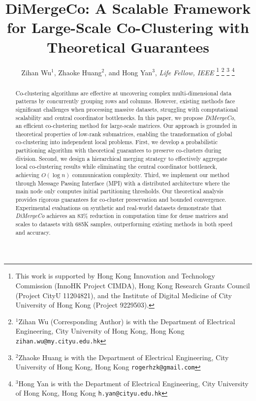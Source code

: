 \documentclass[journal]{IEEEtran}
\theoremstyle{definition}
\theoremstyle{remark} %
\begin{document}
\title{\LARGE \bf DiMergeCo: A Scalable Framework for Large-Scale Co-Clustering with Theoretical Guarantees}


\author{Zihan Wu$^{1}$, Zhaoke Huang$^{2}$, and Hong Yan$^{3}$, \textit{Life Fellow, IEEE}%
    \thanks{This work is supported by Hong Kong Innovation and
        Technology Commission (InnoHK Project CIMDA), Hong
        Kong Research Grants Council (Project CityU 11204821), and the Institute of Digital Medicine of City University of Hong Kong (Project 9229503). }%
    \thanks{$^{1}$Zihan Wu (Corresponding Author) is with the Department of Electrical Engineering,
        City University of Hong Kong, Hong Kong
            {\tt\small zihan.wu@my.cityu.edu.hk}}%
    \thanks{$^{2}$Zhaoke Huang is with the Department of Electrical Engineering,
        City University of Hong Kong, Hong Kong
            {\tt\small rogerhzk@gmail.com}}%
    \thanks{$^{3}$Hong Yan is with the Department of Electrical Engineering,
        City University of Hong Kong, Hong Kong
            {\tt\small h.yan@cityu.edu.hk}}%
}
\maketitle

\begin{abstract}
    Co-clustering algorithms are effective at uncovering complex multi-dimensional data patterns by concurrently grouping rows and columns. However, existing methods face significant challenges when processing massive datasets, struggling with computational scalability and central coordinator bottlenecks. In this paper, we propose \emph{DiMergeCo}, an efficient co-clustering method for large-scale matrices. Our approach is grounded in theoretical properties of low-rank submatrices, enabling the transformation of global co-clustering into independent local problems.  First, we develop a probabilistic partitioning algorithm with theoretical guarantees to preserve co-clusters during division. Second, we design a hierarchical merging strategy to effectively aggregate local co-clustering results while eliminating the central coordinator bottleneck, achieving $O(\log n)$ communication complexity. Third, we implement our method through Message Passing Interface (MPI) with a distributed architecture where the main node only computes initial partitioning thresholds.
    Our theoretical analysis provides rigorous guarantees for co-cluster preservation and bounded convergence. Experimental evaluations on synthetic and real-world datasets demonstrate that \emph{DiMergeCo} achieves an 83\% reduction in computation time for dense matrices and scales to datasets with 685K samples, outperforming existing methods in both speed and accuracy.
\end{abstract}
\end{document}
